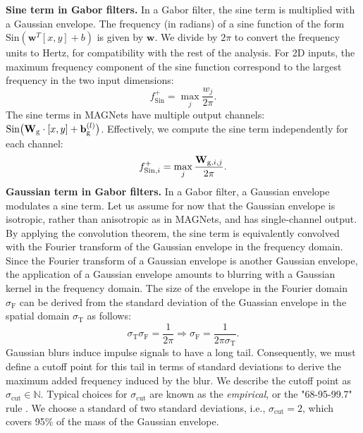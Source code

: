 \documentclass{article} \usepackage{iclr2022_conference,times}
\newcommand{\mat}[1]{\ensuremath{{\mathbf{\MakeUppercase{{#1}}}}}}
\newcommand{\Wm}{\mat{W}}
\begin{document}
\textbf{Sine term in Gabor filters.} In a Gabor filter, the sine term is multiplied with a Gaussian envelope. The frequency (in radians) of a sine function of the form $\mathrm{Sin}(\boldsymbol{w}^T[x,y] + b)$ is given by $\boldsymbol{w}$. We divide by $2 \pi$ to convert the frequency units to Hertz, for compatibility with the rest of the analysis. For 2D inputs, the maximum frequency component of the sine function correspond to the largest frequency in the two input dimensions:
\begin{equation}
    f^+_{\mathrm{Sin}} = \max_{j} \frac{w_{j}}{2 \pi}.
\end{equation}
The sine terms in MAGNets have multiple output channels: $\mathrm{Sin} \big(\Wm_\mathrm{g} \cdot [x, y] + \boldsymbol{\mathrm{b}}_\mathrm{g}^{(l)} \big)$. Effectively, we compute the sine term independently for each channel:
\begin{equation}
    f^+_{\mathrm{Sin}, i} = \max_{j} \frac{\Wm_{\mathrm{g}, i,j}}{2 \pi}.
\end{equation}
\textbf{Gaussian term in Gabor filters.} In a Gabor filter, a Gaussian envelope modulates a sine term. Let us assume for now that the Gaussian envelope is isotropic, rather than anisotropic as in MAGNets, and has single-channel output. By applying the convolution theorem, the sine term is equivalently convolved with the Fourier transform of the Gaussian envelope in the frequency domain. Since the Fourier transform of a Gaussian envelope is another Gaussian envelope, the application of a Gaussian envelope amounts to blurring with a Gaussian kernel in the frequency domain. The size of the envelope in the Fourier domain $\sigma_{\mathrm{F}}$ can be derived from the standard deviation of the Guassian envelope in the spatial domain $\sigma_\mathrm{T}$ as follows:
\begin{equation}
    \sigma_\mathrm{T} \sigma_{\mathrm{F}} = \frac{1}{2 \pi} \Rightarrow \sigma_{\mathrm{F}} = \frac{1}{2 \pi \sigma_\mathrm{T}}.
\end{equation}
Gaussian blurs induce impulse signals to have a long tail. Consequently, we must define a cutoff point for this tail in terms of standard deviations to derive the maximum added frequency induced by the blur. We describe the cutoff point as $\sigma_{\mathrm{cut}} \in \mathbb{N}$. Typical choices for $\sigma_{\mathrm{cut}}$ are known as the \textit{empirical}, or the "68-95-99.7" rule \citep{hald2007moivre}. We choose a standard of two standard deviations, i.e., $\sigma_{\mathrm{cut}}{=}2$, which covers 95\% of the mass of the Gaussian envelope.
\end{document}
